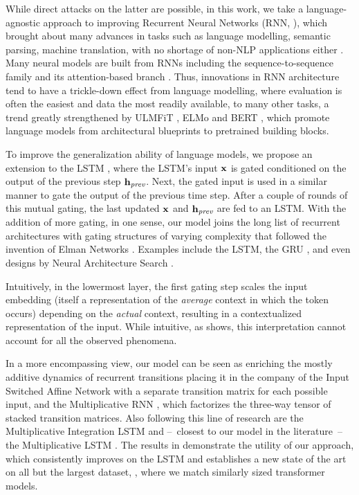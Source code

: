 While direct attacks on the latter are possible, in this work, we
take a language-agnostic approach to improving Recurrent Neural
Networks (RNN, \cite{rumelhart1988learning}), which brought about many
advances in tasks such as language modelling, semantic parsing,
machine translation, with no shortage of non-NLP applications either
\citep{bakker2002reinforcement,mayer2008system}.
%
Many neural models are built from RNNs including the
sequence-to-sequence family \citep{sutskever2014sequence} and its
attention-based branch \citep{bahdanau2014neural}.
%
Thus, innovations in RNN architecture tend to have a trickle-down
effect from language modelling, where evaluation is often the easiest
and data the most readily available, to many other tasks, a trend
greatly strengthened by ULMFiT \citep{howard2018universal}, ELMo
\citep{peters2018deep} and BERT \citep{devlin2018bert}, which promote
language models from architectural blueprints to pretrained building
blocks.

To improve the generalization ability of language models, we propose
an extension to the LSTM \citep{hochreiter1997lstm}, where the LSTM's
input $\mathbf{x}$ is gated conditioned on the output of the previous step
$\mathbf{h}_{\textit{prev}}$.
%
Next, the gated input is used in a similar manner to gate the output
of the previous time step.
%
After a couple of rounds of this mutual gating, the last updated $\mathbf{x}$
and $\mathbf{h}_{\textit{prev}}$ are fed to an LSTM.
%
With the addition of more gating, in one sense,
our model joins the long list of recurrent architectures with gating
structures of varying complexity that followed the invention of Elman
Networks \citep{elman1990finding}.
%
Examples include the LSTM, the GRU \citep{chung2015gated}, and even
designs by Neural Architecture Search
\citep{DBLP:journals/corr/ZophL16}.

Intuitively, in the lowermost layer, the first gating step scales the
input embedding (itself a representation of the \emph{average} context
in which the token occurs) depending on the \emph{actual} context,
resulting in a contextualized representation of the input.
%
While intuitive, as  shows, this
interpretation cannot account for all the observed phenomena.

In a more encompassing view, our model can be seen as enriching the
mostly additive dynamics of recurrent transitions placing it in the
company of the Input Switched Affine Network \citep{foerster2017input}
with a separate transition matrix for each possible input, and the
Multiplicative RNN \citep{sutskever2011generating}, which factorizes
the three-way tensor of stacked transition matrices.
%
Also following this line of research are the Multiplicative
Integration LSTM \citep{wu2016multiplicative} and --~closest to our
model in the literature~-- the Multiplicative LSTM
\citep{DBLP:journals/corr/KrauseLMR16}.
%
The results in  demonstrate the utility of
our approach, which consistently improves on the LSTM and establishes
a new state of the art on all but the largest dataset, \enwik, where
we match similarly sized transformer models.

